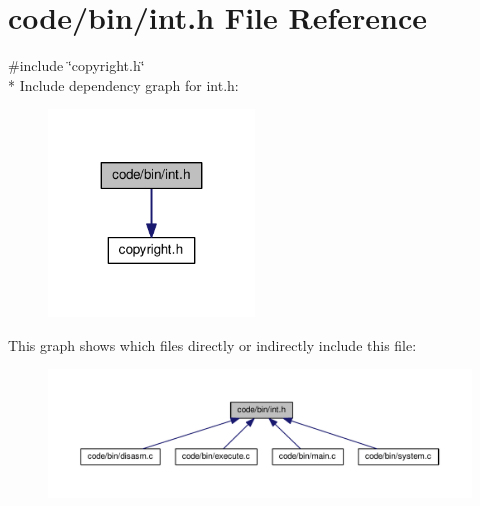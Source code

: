 \section{code/bin/int.h File Reference}
\label{int_8h}
{\ttfamily \#include \char`\"{}copyright.\+h\char`\"{}}\\*
Include dependency graph for int.\+h\+:
\nopagebreak
\begin{figure}[H]
\begin{center}
\leavevmode
\includegraphics[width=155pt]{int_8h__incl}
\end{center}
\end{figure}
This graph shows which files directly or indirectly include this file\+:
\nopagebreak
\begin{figure}[H]
\begin{center}
\leavevmode
\includegraphics[width=350pt]{int_8h__dep__incl}
\end{center}
\end{figure}

